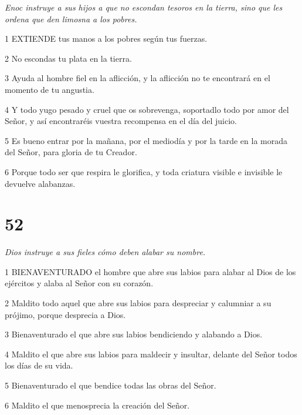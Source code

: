 \par \textit{Enoc instruye a sus hijos a que no escondan tesoros en la tierra, sino que les ordena que den limosna a los pobres.}

\par 1 EXTIENDE tus manos a los pobres según tus fuerzas.

\par 2 No escondas tu plata en la tierra.

\par 3 Ayuda al hombre fiel en la aflicción, y la aflicción no te encontrará en el momento de tu angustia.

\par 4 Y todo yugo pesado y cruel que os sobrevenga, soportadlo todo por amor del Señor, y así encontraréis vuestra recompensa en el día del juicio.

\par 5 Es bueno entrar por la mañana, por el mediodía y por la tarde en la morada del Señor, para gloria de tu Creador.

\par 6 Porque todo ser que respira le glorifica, y toda criatura visible e invisible le devuelve alabanzas.

\chapter{52}

\par \textit{Dios instruye a sus fieles cómo deben alabar su nombre.}

\par 1 BIENAVENTURADO el hombre que abre sus labios para alabar al Dios de los ejércitos y alaba al Señor con su corazón.

\par 2 Maldito todo aquel que abre sus labios para despreciar y calumniar a su prójimo, porque desprecia a Dios.

\par 3 Bienaventurado el que abre sus labios bendiciendo y alabando a Dios.

\par 4 Maldito el que abre sus labios para maldecir y insultar, delante del Señor todos los días de su vida.

\par 5 Bienaventurado el que bendice todas las obras del Señor.

\par 6 Maldito el que menosprecia la creación del Señor.

